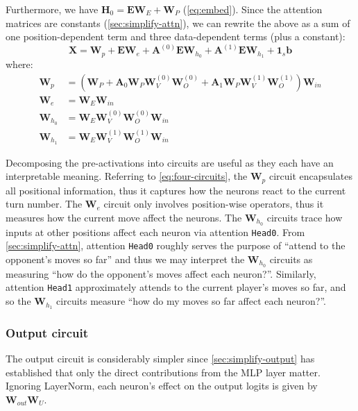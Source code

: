 \documentclass{article}
\renewcommand{\v}[1]{\mathbf{\bm{#1}}}
\newcommand{\m}[1]{\mathbf{\bm{#1}}}
\newcounter{num}
\begin{document}
Furthermore, we have $\m{H}_0 = \m{E} \m{W}_E + \m{W}_P$ (\cref{eq:embed}). Since the attention matrices are constants (\cref{sec:simplify-attn}), we can rewrite the above as a sum of one position-dependent term and three data-dependent terms (plus a constant):
\begin{equation} \label{eq:four-circuits}
    \m{X} =
    \m{W}_p
    + \m{E} \m{W}_e
    + \m{A}^{(0)} \m{E} \m{W}_{h_0}
    + \m{A}^{(1)} \m{E} \m{W}_{h_1}
    + \v{1}_s \v{b}
\end{equation}
where:
\begin{equation*}
    \begin{aligned}
        \m{W}_p
         & = \left(\m{W}_P
        + \m{A}_0 \m{W}_P \m{W}_V^{(0)} \m{W}_O^{(0)}
        + \m{A}_1 \m{W}_P \m{W}_V^{(1)} \m{W}_O^{(1)}
        \right) \m{W}_{in}                                  \\
        \m{W}_e
         & = \m{W}_E \m{W}_{in}                             \\
        \m{W}_{h_0}
         & = \m{W}_E \m{W}_V^{(0)} \m{W}_O^{(0)} \m{W}_{in} \\
        \m{W}_{h_1}
         & = \m{W}_E \m{W}_V^{(1)} \m{W}_O^{(1)} \m{W}_{in}
    \end{aligned}
\end{equation*}

Decomposing the pre-activations into circuits are useful as they each have an interpretable meaning. Referring to \cref{eq:four-circuits}, the $\m{W}_p$ circuit encapsulates all positional information, thus it captures how the neurons react to the current turn number. The $\m{W}_e$ circuit only involves position-wise operators, thus it measures how the current move affect the neurons. The $\m{W}_{h_0}$ circuits trace how inputs at other positions affect each neuron via attention \texttt{Head0}. From \cref{sec:simplify-attn}, attention \texttt{Head0} roughly serves the purpose of ``attend to the opponent's moves so far'' and thus we may interpret the $\m{W}_{h_0}$ circuits as measuring ``how do the opponent's moves affect each neuron?''. Similarly, attention \texttt{Head1} approximately attends to the current player's moves so far, and so the $\m{W}_{h_1}$ circuits measure ``how do my moves so far affect each neuron?''.

\subsubsection{Output circuit}

The output circuit is considerably simpler since \cref{sec:simplify-output} has established that only the direct contributions from the MLP layer matter. Ignoring LayerNorm, each neuron's effect on the output logits is given by $\m{W}_{out} \m{W}_U$.
\end{document}
